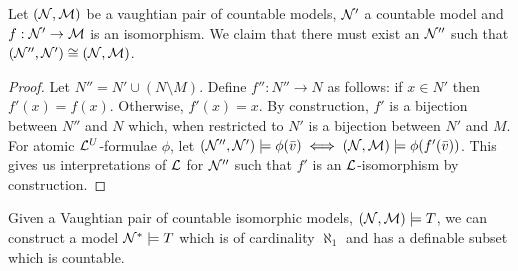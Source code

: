 \begin{lemma}\label{lemma_extend_isomorphically}
Let \((\mathcal{N}, \mathcal{M})\) be a vaughtian pair of countable models, \(\mathcal{N}'\) a countable model and \(f:\mathcal{N}' \to \mathcal{M}\) is an isomorphism. 
We claim that there must exist an \(\mathcal{N}''\) such that \((\mathcal{N}'', \mathcal{N}') \cong (\mathcal{N}, \mathcal{M})\). 
\end{lemma}

\begin{proof}
Let \(N'' = N' \cup (N \setminus M)\).
Define \(f'': N'' \to N\) as follows: if \(x \in N'\) then \(f'(x) = f(x)\). 
Otherwise, \(f'(x) = x\). 
By construction, \(f'\) is a bijection between \(N''\) and \(N\) which, when restricted to \(N'\) is a bijection between  \(N'\) and \(M\). 
For atomic \(\mathcal{L}^U\)-formulae \(\phi\), let \((\mathcal{N}'', \mathcal{N}') \models \phi(\bar{v}) \iff (\mathcal{N}, \mathcal{M}) \models \phi(f'(\bar{v}))\).
This gives us interpretations of \(\mathcal{L}\) for \(\mathcal{N}''\) such that \(f'\) is an \(\mathcal{L}\)-isomorphism by construction. 
\end{proof}

\begin{theorem}\label{theorem_aleph_one_vaughtian_pair}
Given a Vaughtian pair of countable isomorphic models, \((\mathcal{N}, \mathcal{M}) \models T\), we can construct a model \(\mathcal{N}^* \models T\) which is of cardinality \(\aleph_1\) and has a definable subset which is countable.  
\end{theorem}


